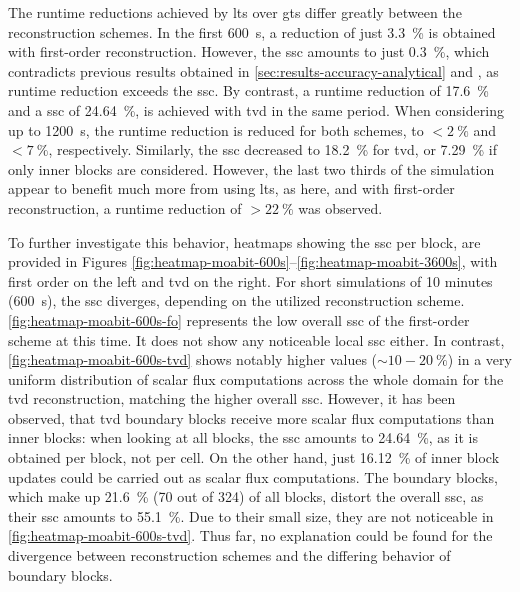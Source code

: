 The runtime reductions achieved by \gls{lts} over \gls{gts} differ greatly between the reconstruction schemes. 
In the first \SI{600}{\second}, a reduction of just \SI{3.3}{\percent} is obtained with first-order reconstruction. However, the \gls{ssc} amounts to just \SI{0.3}{\percent}, which contradicts previous results obtained in \autoref{sec:results-accuracy-analytical} and \textcite{crossley2003}, as runtime reduction exceeds the \gls{ssc}.
By contrast, a runtime reduction of \SI{17.6}{\percent} and a \gls{ssc} of \SI{24.64}{\percent}, is achieved with \gls{tvd} in the same period.
When considering up to \SI{1200}{\second}, the runtime reduction is reduced for both schemes, to $<\SI{2}{\percent}$ and $<\SI{7}{\percent}$, respectively. 
Similarly, the \gls{ssc} decreased to \SI{18.2}{\percent} for \gls{tvd}, or \SI{7.29}{\percent} if only inner blocks are considered.
However, the last two thirds of the simulation appear to benefit much more from using \gls{lts}, as here, and with first-order reconstruction, a runtime reduction of $>\SI{22}{\percent}$ was observed.

To further investigate this behavior, heatmaps showing the \gls{ssc} per block, are provided in 
Figures \ref{fig:heatmap-moabit-600s}--\ref{fig:heatmap-moabit-3600s}, with first order on the left and \gls{tvd} on the right. 
%
For short simulations of 10 minutes (\SI{600}{\second}), the \gls{ssc} diverges, depending on the utilized reconstruction scheme.
\autoref{fig:heatmap-moabit-600s-fo} represents the low overall \gls{ssc} of the first-order scheme
at this time. It does not show any noticeable local \gls{ssc} either.
In contrast, \autoref{fig:heatmap-moabit-600s-tvd} shows notably higher values ($\sim\!10-\SI{20}{\percent}$) in a very uniform distribution of scalar flux computations across the whole domain for the \gls{tvd} reconstruction, matching the higher overall \gls{ssc}.
However, it has been observed, that \gls{tvd} boundary blocks receive more scalar flux computations than inner blocks: 
when looking at all blocks, the \gls{ssc} amounts to \SI{24.64}{\percent}, as it is obtained per block, not per cell.
On the other hand, just \SI{16.12}{\percent} of inner block updates could be carried out as scalar flux computations.
The boundary blocks, which make up \SI{21.6}{\percent} (70 out of 324) of all blocks, distort the overall \acrlong{ssc}, as their \acrshort{ssc} amounts to \SI{55.1}{\percent}.
Due to their small size, they are not noticeable in \autoref{fig:heatmap-moabit-600s-tvd}.
Thus far, no explanation could be found for the divergence between reconstruction schemes and the differing behavior of boundary blocks.

